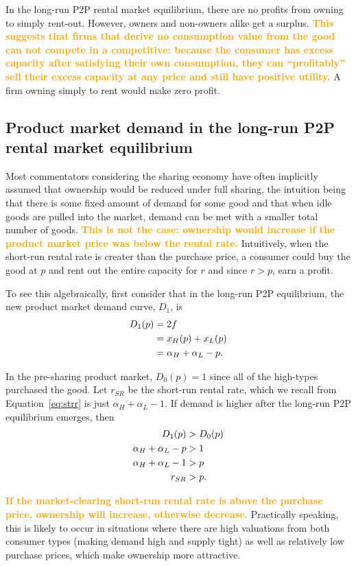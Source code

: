 \documentclass[11pt]{article}
\newcommand{\important}[1]{\textcolor{orange}{\textbf{#1}}}
\begin{document}
In the long-run P2P rental market equilibrium, there are no profits from owning to simply rent-out. 
However, owners and non-owners alike get a surplus. 
\important{This suggests that firms that derive no consumption value from the good can not compete in a competitive: 
because the consumer has excess capacity after satisfying their own consumption, they can ``profitably'' sell their excess capacity at any price and still have positive utility.} 
A firm owning simply to rent would make zero profit. 

\subsection{Product market demand in the long-run P2P rental market equilibrium} 
Most commentators considering the sharing economy have often implicitly assumed that ownership would be reduced under full sharing, the intuition being that there is some fixed amount of demand for some good and that when idle goods are pulled into the market, demand can be met with a smaller total number of goods. 
\important{This is not the case:  
ownership would increase if the product market price was below the rental rate.} 
Intuitively, when the short-run rental rate is creater than the purchase price, a consumer could buy the good at $p$ and rent out the entire capacity for $r$ and since $r > p$, earn a profit. 

To see this algebraically, first consider that in the long-run P2P equilibrium, the new product market demand curve, $D_1$, is
\begin{align}
D_1(p) &= 2f \notag \\  
     &= x_H(p) + x_L(p) \notag \\ 
     &= \alpha_H + \alpha_L - p.  
\end{align} 

In the pre-sharing product market, $D_0(p) = 1$ since all of the high-types purchased the good. 
Let $r_{SR}$ be the short-run rental rate, which we recall from Equation~\ref{eq:strr} is just $\alpha_H + \alpha_L - 1$. 
If demand is higher after the long-run P2P equilibrium emerges, then  
\begin{align} 
D_{1}(p) & > D_{0}(p) \notag \\
\alpha_H + \alpha_L - p &> 1 \notag \\ 
\alpha_H + \alpha_L - 1 &> p \notag \\ 
r_{SR} &>  p. 
\end{align} 

\important{If the market-clearing short-run rental rate is above the purchase price, ownership will increase, otherwise decrease.}
Practically speaking, this is likely to occur in situations where there are high valuations from both consumer types (making demand high and supply tight) as well as relatively low purchase prices, which make ownership more attractive. 
\end{document}
